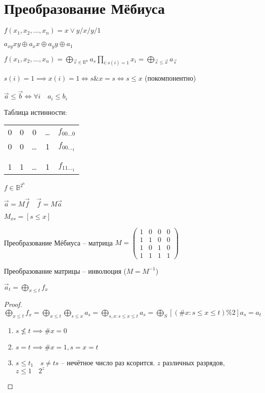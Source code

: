 \documentclass{book}
\theoremstyle{definition}
\begin{document}
\section{Преобразование Мёбиуса}
$f(x_1, x_2, \ldots, x_{n} ) = x\vee y / x / y / 1$    

$a_{xy}xy \oplus a_x x \oplus a_y y \oplus a_1$

$f(x_1, x_2, \ldots, x_{n} ) = \bigoplus\limits_{\vec s \in \mathbb{B}^n} a_s \prod\limits_{i:s(i) = 1} x_i = \bigoplus\limits_{\vec s\leqslant \vec x} a_{\vec s}$

$s(i) = 1 \implies  x(i) = 1 \iff  s\& x = s \iff s\leqslant x$ (покомпонентно)

\begin{definition}
    [Доминирование]

    $\vec a \leqslant  \vec b \iff  \forall i\quad a_i\leqslant b_i$
\end{definition}

Таблица истинности:
\begin{tabular}{cccc|c}
    0&0&0&\ldots&$f_{00\ldots0}$\\
    0& 0 & \ldots & 1& $f_{00\ldots_1}$\\
     &&&&\\
     &&&&\\
    1&1&\ldots&1&$f_{11\ldots_1}$\\
\end{tabular}

$f\in \mathbb{B}^{2^n}$

$\vec a = M\vec f\quad \vec f = M\vec a$

$M_{xs} = [s\leqslant x]$

Преобразование Мёбиуса -- матрица $M = \begin{pmatrix} 1&0&0&0\\1&1&0&0\\1&0&1&0\\1&1&1&1 \end{pmatrix}$



\begin{theorem}
    Преобразование матрицы --  инволюция ($M = M^{-1}$)

    $\vec a_t = \bigoplus\limits_{x\leqslant t} f_x $
\end{theorem}
\begin{proof}
    $\bigoplus\limits_{x\leqslant t}f_x = \bigoplus\limits_{x\leqslant t}\bigoplus\limits_{s\leqslant x} a_s = \bigoplus\limits_{s,x:s\leqslant x\leqslant t}a_s = \bigoplus\limits_S [(\#x: s\leqslant x\leqslant t)\%2]a_s = a_t$

    \begin{enumerate}
        \item $s\not\leqslant t \implies  \#x = 0$
        \item $s=t \implies  \#x = 1, s=x=t$
        \item $s\leqslant t_1\quad s\neq ts$ -- нечётное число раз ксорится. $z$ различных разрядов, $z\leqslant 1\quad 2^{z}$
    \end{enumerate}
\end{proof}
\end{document}
